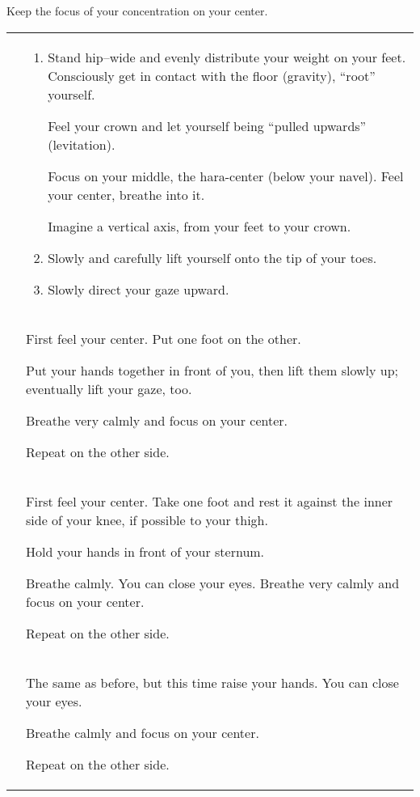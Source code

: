 \documentclass[../main.tex]{subfiles}
\begin{document}
\label{Ex:Equi}

Keep the focus of your concentration on your center.

\noindent
\begin{tabular}{p{3cm} p{9cm} }
 \raisebox{-1.4\totalheight}{\texttt{[image: EqEx1]}} & 
\begin{enumerate}[label=\alph*)]
\item Stand hip--wide and evenly distribute your weight on your feet. Consciously get in {contact with the floor} (gravity), ``root'' yourself.

Feel your {crown} and let yourself being ``pulled upwards'' (levitation).

Focus on your middle, the hara-center\index{hara center} (below your navel).
Feel your {center}, breathe into it.

Imagine a {vertical axis}\index{central vertical axis}, from your feet to your crown.

\item Slowly and carefully {lift yourself} onto the tip of your toes.
                                      
\item Slowly direct your {gaze upward}.
\end{enumerate}
  \\
   \raisebox{-0.8\totalheight}{\texttt{[image: EqEx2]}}\label{sf:equil} & 
First feel your center. Put {one foot on the other}. 

Put your {hands together} in front of you, then {lift them} slowly up; eventually lift your gaze, too.

Breathe very calmly and focus on your center.

Repeat on the other side.
  \\
   \raisebox{-0.8\totalheight}{\texttt{[image: EqEx3]}} & 
First feel your center. Take one {foot} 
and rest it against the {inner side of your knee}, if possible to your {thigh}.

Hold your hands in front of your sternum.

Breathe calmly. You can close your eyes. Breathe very calmly and focus on your center.

Repeat on the other side.
  \\
   \raisebox{-0.6\totalheight}{\texttt{[image: EqEx4]}} & 
The same as before, but this time {raise your hands}. You can close your eyes.

Breathe calmly and focus on your center.

Repeat on the other side.

\end{tabular}
\end{document}
